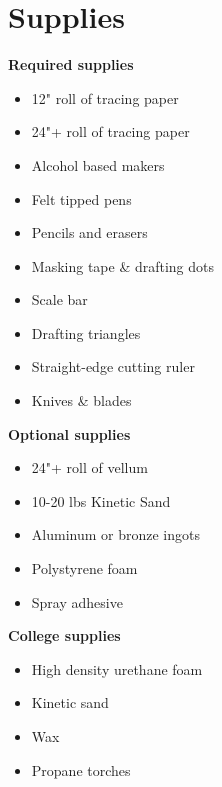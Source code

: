 \documentclass[11pt,article,oneside]{memoir}
\begin{document}
\section{Supplies}
\begin{multicols}{2}
\raggedright
\small
%
\textbf{Required supplies}
\begin{itemize}
\item 12" roll of tracing paper
\item 24"+ roll of tracing paper
\item Alcohol based makers
\item Felt tipped pens
\item Pencils and erasers
\item Masking tape \& drafting dots
\item Scale bar
\item Drafting triangles
\item Straight-edge cutting ruler 
\item Knives \& blades
\end{itemize}

\textbf{Optional supplies}
\begin{itemize}
\item 24"+ roll of vellum
\item 10-20 lbs Kinetic Sand
\item Aluminum or bronze ingots
\item Polystyrene foam
\item Spray adhesive
\end{itemize}

\textbf{College supplies}
\begin{itemize}
\item High density urethane foam
\item Kinetic sand
\item Wax
\item Propane torches
\end{itemize}


\end{multicols}
\end{document}
